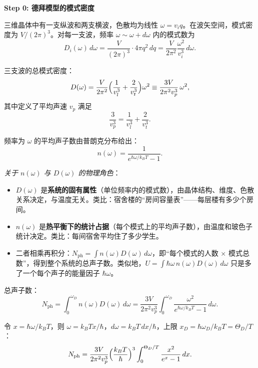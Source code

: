 \begin{derivationbox}[标准解题过程]
\textbf{Step 0: 德拜模型的模式密度}

三维晶体中有一支纵波和两支横波，色散均为线性 $\omega=v_iq$。在波矢空间，模式密度为 $V/(2\pi)^3$。对每一支波，频率 $\omega\sim\omega+d\omega$ 内的模式数为
\begin{equation}
D_i(\omega)\,d\omega = \frac{V}{(2\pi)^3}\cdot4\pi q^2\,dq = \frac{V}{2\pi^2}\frac{\omega^2}{v_i^3}\,d\omega.
\end{equation}

三支波的总模式密度：
\begin{equation}
D(\omega) = \frac{V}{2\pi^2}\Bigl(\frac{1}{v_l^3}+\frac{2}{v_t^3}\Bigr)\omega^2 \equiv \frac{3V}{2\pi^2v_p^3}\,\omega^2,
\label{eq:debye-Domega}
\end{equation}
其中定义了平均声速 $v_p$ 满足
\begin{equation}
\frac{3}{v_p^3}=\frac{1}{v_l^3}+\frac{2}{v_t^3}.
\end{equation}

频率为 $\omega$ 的平均声子数由普朗克分布给出：
\begin{equation}
n(\omega)=\frac{1}{e^{\hbar\omega/k_BT}-1}.
\label{eq:planck}
\end{equation}

\textit{关于 $n(\omega)$ 与 $D(\omega)$ 的物理角色}：
\begin{itemize}
    \item $D(\omega)$ 是\textbf{系统的固有属性}（单位频率内的模式数），由晶体结构、维度、色散关系决定，与温度无关。类比：宿舍楼的``房间容量表''——每层楼有多少个房间。
    \item $n(\omega)$ 是\textbf{热平衡下的统计占据}（每个模式上的平均声子数），由温度和玻色子统计决定。类比：每间宿舍平均住了多少学生。
    \item 二者相乘再积分：$\displaystyle N_{\text{ph}}=\int n(\omega)D(\omega)\,d\omega$，即``每个模式的人数 × 模式总数''，得到整个系统的总声子数。类似地，$U=\int\hbar\omega\,n(\omega)D(\omega)\,d\omega$ 只是多了一个每个声子的能量因子 $\hbar\omega$。
\end{itemize}

总声子数：
\begin{equation}
N_{\text{ph}}=\int_0^{\omega_D}n(\omega)D(\omega)\,d\omega
=\frac{3V}{2\pi^2v_p^3}\int_0^{\omega_D}\frac{\omega^2}{e^{\hbar\omega/k_BT}-1}\,d\omega.
\label{eq:Nph-integral}
\end{equation}

令 $x=\hbar\omega/k_BT$，则 $\omega=k_BTx/\hbar$，$d\omega=k_BT\,dx/\hbar$，上限 $x_D=\hbar\omega_D/k_BT=\Theta_D/T$：
\begin{equation}
N_{\text{ph}}=\frac{3V}{2\pi^2v_p^3}\Bigl(\frac{k_BT}{\hbar}\Bigr)^3\int_0^{\Theta_D/T}\frac{x^2}{e^x-1}\,dx.
\label{eq:Nph-dimensionless}
\end{equation}


\end{derivationbox}
